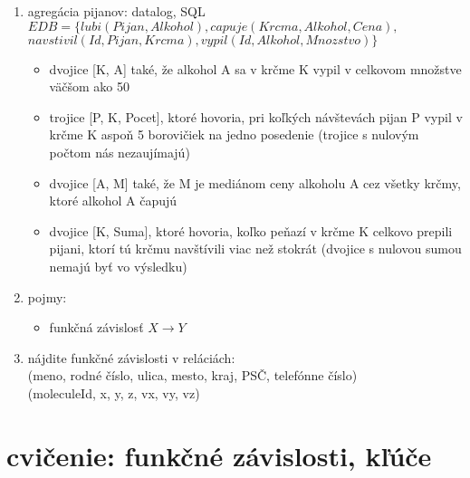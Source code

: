 \documentclass[10pt, a4paper]{article}
\begin{document}
\begin{enumerate}
\item agregácia pijanov: datalog, SQL
$EDB=\{lubi(Pijan, Alkohol), capuje(Krcma, Alkohol, Cena),$\\
\hspace*{1cm} $navstivil(Id, Pijan, Krcma), vypil(Id, Alkohol, Mnozstvo)\}$
\begin{itemize}
    \item dvojice [K, A] také, že alkohol A sa v krčme K vypil v celkovom množstve väčšom ako 50
    \item trojice [P, K, Pocet], ktoré hovoria, pri koľkých návštevách pijan P vypil v krčme K aspoň 5 borovičiek na jedno posedenie (trojice s nulovým počtom nás nezaujímajú)
    \item dvojice [A, M] také, že M je mediánom ceny alkoholu A cez všetky krčmy, ktoré alkohol A čapujú
    \item dvojice [K, Suma], ktoré hovoria, koľko peňazí v krčme K celkovo prepili pijani, ktorí tú krčmu navštívili viac než stokrát (dvojice s nulovou sumou nemajú byť vo výsledku)
\end{itemize}

\item pojmy:
\begin{itemize}
    \item funkčná závislosť $X\to Y$
\end{itemize}


\item nájdite funkčné závislosti v reláciách:\\
    (meno, rodné číslo, ulica, mesto, kraj, PSČ, telefónne číslo)\\
    (moleculeId, x, y, z, vx, vy, vz)

\end{enumerate}


\newpage


\section{cvičenie: funkčné závislosti, kľúče}
\end{document}
